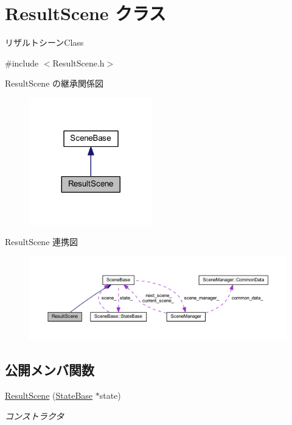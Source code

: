\hypertarget{class_result_scene}{}\section{Result\+Scene クラス}
\label{class_result_scene}


リザルトシーン\+Class  




{\ttfamily \#include $<$Result\+Scene.\+h$>$}



Result\+Scene の継承関係図
\nopagebreak
\begin{figure}[H]
\begin{center}
\leavevmode
\includegraphics[width=152pt]{class_result_scene__inherit__graph}
\end{center}
\end{figure}


Result\+Scene 連携図
\nopagebreak
\begin{figure}[H]
\begin{center}
\leavevmode
\includegraphics[width=350pt]{class_result_scene__coll__graph}
\end{center}
\end{figure}
\subsection*{公開メンバ関数}
\begin{DoxyCompactItemize}
\item 
\mbox{\hyperlink{class_result_scene_ac184d41a92125eda200a132fe7aadd2e}{Result\+Scene}} (\mbox{\hyperlink{class_scene_base_1_1_state_base}{State\+Base}} $\ast$state)
\begin{DoxyCompactList}\small\item\em コンストラクタ \end{DoxyCompactList}\end{DoxyCompactItemize}


